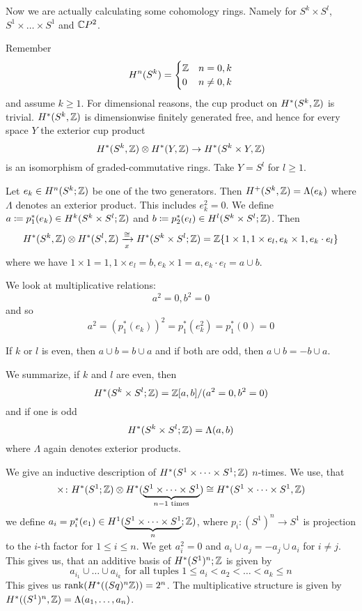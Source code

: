 \documentclass[language=english]{TemplateLecture}
\begin{document}
Now we are actually calculating some cohomology rings. Namely for \(S^k \times S^l\), \(S^1 \times \dots \times S^1\) and \(\mathbb{C} P^2\).

Remember
\[H^n(S^k) = \begin{cases}
    \mathbb{Z} & n = 0,k \\
    0 & n \neq 0,k \\
\end{cases}\]
and assume \(k \geq 1\). For dimensional reasons, the cup product on \(H^*(S^k, \mathbb{Z})\) is trivial. \(H^*(S^k, \mathbb{Z})\) is dimensionwise finitely generated free, and hence for every space \(Y\) the exterior cup product
\[H^*(S^k, \mathbb{Z}) \otimes H^*(Y, \mathbb{Z}) \to H^*(S^k \times Y, \mathbb{Z})\]
is an isomorphism of graded-commutative rings. Take \(Y = S^l\) for \(l \geq 1\).

Let \(e_k \in H^n(S^k; \mathbb{Z})\) be one of the two generators. Then \(H^+(S^k, \mathbb{Z}) = \Lambda(e_k)\) where \(\Lambda\) denotes an exterior product. This includes \(e_k^2 = 0\). We define \(a \coloneq p_1^*(e_k) \in H^k(S^k \times S^l; \mathbb{Z})\) and \(b\coloneq p_2^*(e_l) \in H^l(S^k \times S^l; \mathbb{Z})\). Then 
\[H^*(S^k, \mathbb{Z}) \otimes H^*(S^l, \mathbb{Z}) \xrightarrow[x]{\cong} H^*(S^k \times S^l; \mathbb{Z}) = \mathbb{Z}\{1 \times 1, 1 \times e_l, e_k \times 1, e_k \cdot e_l\}\]
where we have \(1\times 1 = 1, 1 \times e_l = b, e_k \times 1 = a, e_k \cdot e_l = a\cup b\).

We look at multiplicative relations:
\[a^2 = 0, b^2 = 0\]
and so
\[a^2 = (p_1^*(e_k))^2 = p_1^*(e_k^2) = p_1^*(0) = 0\]

If \(k \) or \(l\) is even, then \(a \cup b = b\cup a\) and if both are odd, then \(a\cup b = - b\cup a\).

We summarize, if \(k\) and \(l\) are even, then
\[H^*(S^k \times S^l; \mathbb{Z}) = \mathbb{Z}[a,b]/(a^2 = 0, b^2 = 0)\]
and if one is odd
\[H^*(S^k \times S^l; \mathbb{Z}) = \Lambda(a,b)\]
where \(\Lambda\) again denotes exterior products.


We give an inductive description of  \(H^*(S^1 \times \dots \times S^1; \mathbb{Z})\) \(n\)-times. We use, that
\[\times \colon H^*(S^1; \mathbb{Z}) \otimes H^*(\underbrace{S^1 \times \dots \times S^1}_{n-1 \text{ times}}) \cong H^*(S^1\times \dots \times S^1, \mathbb{Z})\]
 we define \(a_i = p_i^*(e_1) \in H^1(\underbrace{S^1 \times \dots \times S^1}_{n}; \mathbb{Z})\), where \(p_i \colon (S^1)^n \to S^1\) is projection to the \(i\)-th factor for \(1 \leq i \leq n\). We get \(a_i^2 = 0\) and \(a_i \cup a_j = - a_j \cup a_i\) for \(i \neq j\). This gives us, that an additive basis of \(H^*(S^1)^n; \mathbb{Z}\) is given by
 \[a_{i_1} \cup \dots \cup a_{i_k} \text{ for all tuples } 1 \leq a_i < a_2 < \dots < a_k \leq n\]
 This gives us \(\mathrm{rank}(H^*((S^^1)^n \IZ)) = 2^n\).
 The multiplicative structure is given by \(H^*((S^1)^n, \mathbb{Z}) = \Lambda(a_1, \dots, a_n)\).
\end{document}
